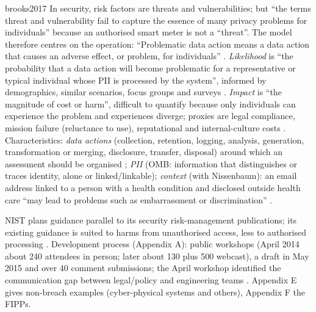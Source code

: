 \begin{papercard}{brooks2017}
 In security, risk factors are threats and vulnerabilities; but ``the terms threat and vulnerability fail to capture the essence of many privacy problems for individuals'' because an authorised smart meter is not a ``threat''. The model therefore centres on the operation: ``Problematic data action means a data action that causes an adverse effect, or problem, for individuals'' . \emph{Likelihood} is ``the probability that a data action will become problematic for a representative or typical individual whose PII is processed by the system'', informed by demographics, similar scenarios, focus groups and surveys . \emph{Impact} is ``the magnitude of cost or harm'', difficult to quantify because only individuals can experience the problem and experiences diverge; proxies are legal compliance, mission failure (reluctance to use), reputational and internal-culture costs . Characteristics: \emph{data actions} (collection, retention, logging, analysis, generation, transformation or merging, disclosure, transfer, disposal) around which an assessment should be organised ; \emph{PII} (OMB: information that distinguishes or traces identity, alone or linked/linkable); \emph{context} (with Nissenbaum): an email address linked to a person with a health condition and disclosed outside health care ``may lead to problems such as embarrassment or discrimination'' .

 NIST plans guidance parallel to its security risk-management publications; its existing guidance is suited to harms from unauthorised access, less to authorised processing . Development process (Appendix A): public workshops (April 2014 about 240 attendees in person; later about 130 plus 500 webcast), a draft in May 2015 and over 40 comment submissions; the April workshop identified the communication gap between legal/policy and engineering teams . Appendix E gives non-breach examples (cyber-physical systems and others), Appendix F the FIPPs.


\end{papercard}
